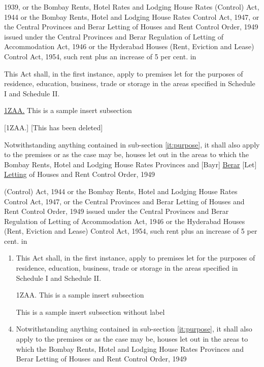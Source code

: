 \documentclass[11pt]{report}
\newcommand{\ins}[1]{\underline{#1}}
\newcommand{\del}[1]{[#1]}
\newcommand{\subs}[2]{\del{#1} \ins{#2}}
\begin{document}
1939, or the Bombay Rents, Hotel Rates and Lodging House Rates
(Control) Act, 1944 or the Bombay Rents, Hotel and Lodging House Rates
Control Act, 1947, or the Central Provinces and Berar Letting of
Houses and Rent Control Order, 1949 issued under the Central Provinces
and Berar Regulation of Letting of Accommodation Act, 1946 or the
Hyderabad Houses (Rent, Eviction and Lease) Control Act, 1954, such
rent plus an increase of 5 per cent. in
\begin{list}{.}{%
    \settowidth{}
    \leftmargin{}
    \advance\leftmargin{}
    \advance\leftmargin{} 
    \advance\leftmargin{} 
  }
\item This Act shall, in the first instance, apply to premises let for
  the purposes of residence, education, business, trade or storage in
  the areas specified in Schedule I and Schedule II.
  \label{it:purpose}
\item[\ins{1ZAA.}] This is a sample insert subsection
\item[\del{1ZAA.}] \del{This has been deleted}
\item Notwithstanding anything contained in sub-section
  \ref{it:purpose}, it shall
  also apply to the premises or as the case may be, houses let out in
  the areas to which the Bombay Rents, Hotel and Lodging House Rates
  Provinces and \del{Bayr} \ins{Berar} \subs{Let}{Letting} of Houses and Rent Control Order, 1949
\end{list}


(Control) Act, 1944 or the Bombay Rents, Hotel and Lodging House Rates
Control Act, 1947, or the Central Provinces and Berar Letting of
Houses and Rent Control Order, 1949 issued under the Central Provinces
and Berar Regulation of Letting of Accommodation Act, 1946 or the
Hyderabad Houses (Rent, Eviction and Lease) Control Act, 1954, such
rent plus an increase of 5 per cent. in
\begin{enumerate}
\item This Act shall, in the first instance, apply to premises let for
  the purposes of residence, education, business, trade or storage in
  the areas specified in Schedule I and Schedule II.
  \label{it:purpose}
\item[1ZAA.] This is a sample insert subsection

\item[] This is a sample insert subsection without label
\item Notwithstanding anything contained in sub-section
  \ref{it:purpose}, it shall
  also apply to the premises or as the case may be, houses let out in
  the areas to which the Bombay Rents, Hotel and Lodging House Rates
  Provinces and Berar Letting of Houses and Rent Control Order, 1949

\end{enumerate}
\end{document}
